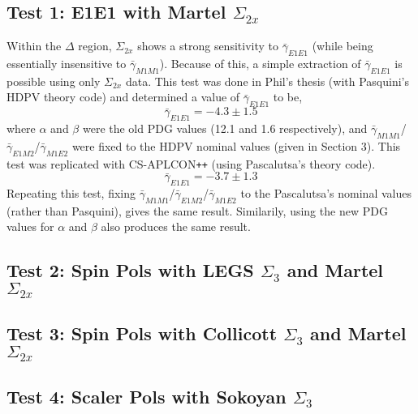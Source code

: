 \documentclass[]{article}
\begin{document}
\subsection{Test 1: E1E1 with Martel $\Sigma_{2x}$}\label{Section:PhilTest}

Within the $\Delta$ region, $\Sigma_{2x}$ shows a strong sensitivity to $\bar{\gamma}_{E1E1}$ (while being essentially insensitive to $\bar{\gamma}_{M1M1}$). Because of this, a simple extraction of $\bar{\gamma}_{E1E1}$ is possible using only $\Sigma_{2x}$ data. This test was done in Phil's thesis (with Pasquini's HDPV theory code) and determined a value of $\bar{\gamma}_{E1E1}$ to be,
%
\begin{equation}
\bar{\gamma}_{E1E1} = -4.3 \pm 1.5 
\end{equation}
%
where $\alpha$ and $\beta$ were the old PDG values (12.1 and 1.6 respectively), and $\bar{\gamma}_{M1M1}$/$\bar{\gamma}_{E1M2}$/$\bar{\gamma}_{M1E2}$ were fixed to the HDPV nominal values (given in Section 3). This test was replicated with CS-APLCON\texttt{++} (using Pascalutsa's theory code). 
%
\begin{equation}
\bar{\gamma}_{E1E1} = -3.7 \pm 1.3 
\end{equation}
%
Repeating this test, fixing $\bar{\gamma}_{M1M1}$/$\bar{\gamma}_{E1M2}$/$\bar{\gamma}_{M1E2}$ to the Pascalutsa's nominal values (rather than Pasquini), gives the same result. Similarily, using the new PDG values for $\alpha$ and $\beta$ also produces the same result. 

\subsection{Test 2: Spin Pols with LEGS $\Sigma_{3}$ and Martel $\Sigma_{2x}$}\label{Section:LEGSTest}



\subsection{Test 3: Spin Pols with Collicott $\Sigma_{3}$ and Martel $\Sigma_{2x}$}\label{Section:CollicottTest}
\subsection{Test 4: Scaler Pols with Sokoyan $\Sigma_{3}$}\label{Section:AlphaBetaTest}
	
\end{document}
